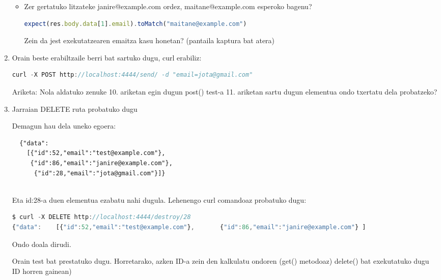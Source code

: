 \begin{enumerate}
\begin{itemize}
    \item 

Zer gertatuko litzateke janire@example.com ordez, maitane@example.com esperoko bagenu?

\begin{lstlisting}[language=JavaScript,numbers=none]
expect(res.body.data[1].email).toMatch("maitane@example.com")
\end{lstlisting}

Zein da jest exekutatzearen emaitza kasu honetan? (pantaila kaptura bat atera)

\end{itemize}

\item 
Orain beste erabiltzaile berri bat sartuko dugu, curl erabiliz:

\begin{lstlisting}[language=JavaScript,numbers=none]       
 curl -X POST http://localhost:4444/send/ -d "email=jota@gmail.com"

\end{lstlisting}


Ariketa: Nola aldatuko zenuke 10. ariketan egin dugun post() test-a 11. ariketan sartu dugun elementua ondo txertatu dela probatzeko?

\item 
Jarraian DELETE ruta probatuko dugu

Demagun hau dela uneko egoera:

\begin{verbatim}
  {"data":
    [{"id":52,"email":"test@example.com"}, 
     {"id":86,"email":"janire@example.com"},
      {"id":28,"email":"jota@gmail.com"}]}   


\end{verbatim}

Eta id:28-a duen elementua ezabatu nahi dugula. Lehenengo curl comandoaz probatuko dugu:

\begin{lstlisting}[language=JavaScript,numbers=none]
$ curl -X DELETE http://localhost:4444/destroy/28
{"data":    [{"id":52,"email":"test@example.com"},       {"id":86,"email":"janire@example.com"} ]
\end{lstlisting}

Ondo doala dirudi. 

Orain test bat prestatuko dugu. Horretarako, azken ID-a zein den kalkulatu ondoren (get() metodoaz) delete() bat exekutatuko dugu ID horren gainean)


\end{enumerate}
